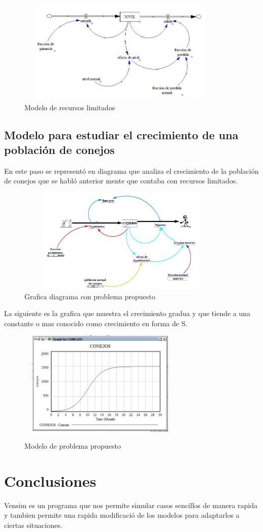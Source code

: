 \documentclass[12pt,letterpaper]{article}
\begin{document}
\begin{figure}
\centering
\includegraphics[width=10cm, height=5cm]{6.JPG}
\caption{\label{fig: } Modelo de recursos limitados }
\end{figure}

\subsection{Modelo para estudiar el crecimiento de una población de conejos}

En este paso se representó en diagrama que analiza el crecimiento de la población de conejos que se habló anterior mente que contaba con recursos limitados.

\begin{figure}
\centering
\includegraphics[width=10cm, height=5cm]{7.JPG}
\caption{\label{fig: } Grafica diagrama con problema propuesto  }
\end{figure}

La siguiente es la grafica que muestra el crecimiento gradua y que tiende a una constante o mas conocido como crecimiento en forma de S.

\includegraphics[width=10cm, height=5cm]{8.JPG}

\begin{figure}
\centering
\caption{\label{fig: } Modelo de problema propuesto  }
\end{figure}

\section{Conclusiones}
	Vensim es un programa que nos permite simular casos sencillos de manera rapida y tambien permite una rapida modificació de los modelos para adaptarlos a ciertas situaciones.
\end{document}
